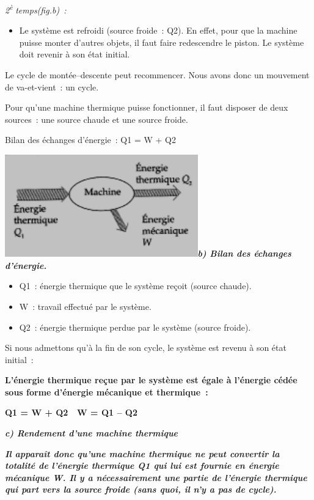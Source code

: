 \emph{2}\textsuperscript{\emph{è}}\emph{ temps(fig.b)~: }

\begin{itemize}
\tightlist
\item
  Le système est refroidi (source froide~: Q2). En effet, pour que la
  machine puisse monter d'autres objets, il faut faire redescendre le
  piston. Le système doit revenir à son état initial.
\end{itemize}

Le cycle de montée--descente peut recommencer. Nous avons donc un
mouvement de va-et-vient~: un cycle.

Pour qu'une machine thermique puisse fonctionner, il faut disposer de
deux sources~: une source chaude et une source froide.

Bilan des échanges d'énergie~: Q1 = W + Q2

\includegraphics[width=8.348cm,height=4.422cm]{Pictures/10000001000000CA0000006B3AF24511F34B3207.png}\emph{\textbf{b)
Bilan des échanges d'énergie. }}

\begin{itemize}
\tightlist
\item
  Q1~: énergie thermique que le système reçoit (source chaude).
\item
  W~: travail effectué par le système.
\item
  Q2~: énergie thermique perdue par le système (source froide).
\end{itemize}

Si nous admettons qu'à la fin de son cycle, le système est revenu à son
état initial~:

\textbf{L'énergie thermique reçue par le système est égale à l'énergie
cédée sous forme d'énergie mécanique et thermique~: }

\textbf{Q1 = W + Q2  W = Q1 -- Q2}

\emph{\textbf{c) Rendement d'une machine thermique }}

\emph{\textbf{Il apparaît donc qu'une machine thermique ne peut
convertir la totalité de l'énergie thermique Q1 qui lui est fournie en
énergie mécanique W. Il y a nécessairement une partie de l'énergie
thermique qui part vers la source froide (sans quoi, il n'y a pas de
cycle). }}

